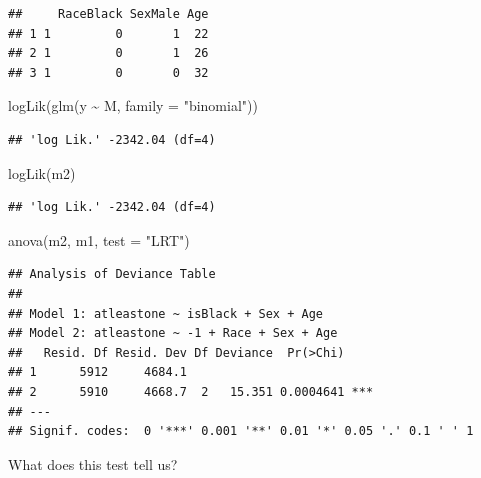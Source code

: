 \documentclass[
  ignorenonframetext,
]{beamer}
\newenvironment{Shaded}{\begin{snugshade}}{\end{snugshade}}
\newcommand{\AttributeTok}[1]{\textcolor[rgb]{0.77,0.63,0.00}{#1}}
\newcommand{\FunctionTok}[1]{\textcolor[rgb]{0.00,0.00,0.00}{#1}}
\newcommand{\NormalTok}[1]{#1}
\newcommand{\SpecialCharTok}[1]{\textcolor[rgb]{0.00,0.00,0.00}{#1}}
\newcommand{\StringTok}[1]{\textcolor[rgb]{0.31,0.60,0.02}{#1}}
\begin{document}
\begin{frame}[fragile]{}
\begin{verbatim}
##     RaceBlack SexMale Age
## 1 1         0       1  22
## 2 1         0       1  26
## 3 1         0       0  32
\end{verbatim}

\begin{Shaded}
\begin{Highlighting}[]
\FunctionTok{logLik}\NormalTok{(}\FunctionTok{glm}\NormalTok{(y }\SpecialCharTok{\textasciitilde{}}\NormalTok{ M, }\AttributeTok{family =} \StringTok{"binomial"}\NormalTok{))}
\end{Highlighting}
\end{Shaded}

\begin{verbatim}
## 'log Lik.' -2342.04 (df=4)
\end{verbatim}

\begin{Shaded}
\begin{Highlighting}[]
\FunctionTok{logLik}\NormalTok{(m2)}
\end{Highlighting}
\end{Shaded}

\begin{verbatim}
## 'log Lik.' -2342.04 (df=4)
\end{verbatim}
\end{frame}

\begin{frame}[fragile]{}
\protect\hypertarget{section-13}{}
\small

\begin{Shaded}
\begin{Highlighting}[]
\FunctionTok{anova}\NormalTok{(m2, m1, }\AttributeTok{test =} \StringTok{"LRT"}\NormalTok{)}
\end{Highlighting}
\end{Shaded}

\begin{verbatim}
## Analysis of Deviance Table
## 
## Model 1: atleastone ~ isBlack + Sex + Age
## Model 2: atleastone ~ -1 + Race + Sex + Age
##   Resid. Df Resid. Dev Df Deviance  Pr(>Chi)    
## 1      5912     4684.1                          
## 2      5910     4668.7  2   15.351 0.0004641 ***
## ---
## Signif. codes:  0 '***' 0.001 '**' 0.01 '*' 0.05 '.' 0.1 ' ' 1
\end{verbatim}

\vspace{12pt}

What does this test tell us?
\end{frame}
\end{document}
